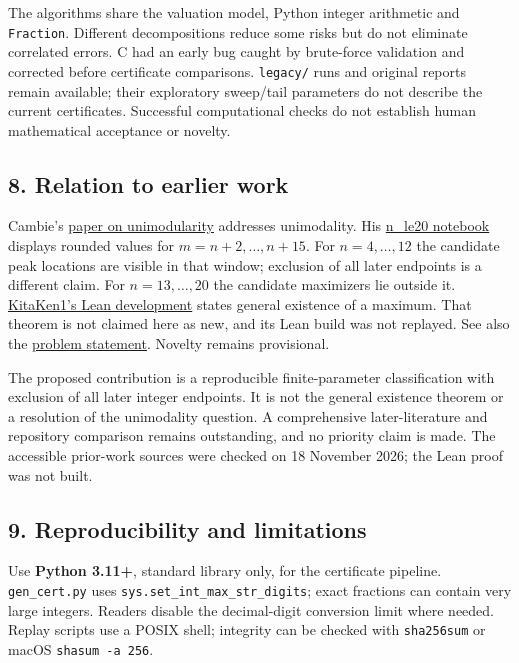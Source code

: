 \documentclass[
  11pt,
]{article}
\begin{document}
The algorithms share the valuation model, Python integer arithmetic and
\texttt{Fraction}. Different decompositions reduce some risks but do not
eliminate correlated errors. C had an early bug caught by brute-force
validation and corrected before certificate comparisons.
\texttt{legacy/} runs and original reports remain available; their
exploratory sweep/tail parameters do not describe the current
certificates. Successful computational checks do not establish human
mathematical acceptance or novelty.

\subsection{8. Relation to earlier work}\label{relation-to-earlier-work}

Cambie's \href{https://arxiv.org/abs/2501.10333}{paper on unimodularity}
addresses unimodality. His
\href{https://github.com/StijnCambie/ErdosProblems/blob/main/Erdosproblem692/n_le20.ipynb}{n\_le20
notebook} displays rounded values for \(m=n+2,\ldots,n+15\). For
\(n=4,\ldots,12\) the candidate peak locations are visible in that
window; exclusion of all later endpoints is a different claim. For
\(n=13,\ldots,20\) the candidate maximizers lie outside it.
\href{https://github.com/KitaKen1/erdos-692-part-ii-lean}{KitaKen1's
Lean development} states general existence of a maximum. That theorem is
not claimed here as new, and its Lean build was not replayed. See also
the \href{https://www.erdosproblems.com/692}{problem statement}. Novelty
remains provisional.

The proposed contribution is a reproducible finite-parameter
classification with exclusion of all later integer endpoints. It is not
the general existence theorem or a resolution of the unimodality
question. A comprehensive later-literature and repository comparison
remains outstanding, and no priority claim is made. The accessible
prior-work sources were checked on 18 November 2026; the Lean proof was
not built.

\subsection{9. Reproducibility and
limitations}\label{reproducibility-and-limitations}

Use \textbf{Python 3.11+}, standard library only, for the certificate
pipeline. \texttt{gen\_cert.py} uses
\texttt{sys.set\_int\_max\_str\_digits}; exact fractions can contain
very large integers. Readers disable the decimal-digit conversion limit
where needed. Replay scripts use a POSIX shell; integrity can be checked
with \texttt{sha256sum} or macOS \texttt{shasum\ -a\ 256}.
\end{document}
